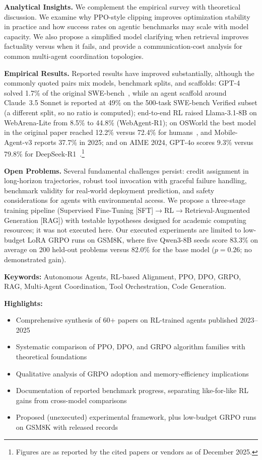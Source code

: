 \documentclass[12pt,a4paper]{report}
\theoremstyle{definition}
\begin{document}
\textbf{Analytical Insights.} We complement the empirical survey with theoretical discussion. We examine why PPO-style clipping improves optimization stability in practice and how success rates on agentic benchmarks may scale with model capacity. We also propose a simplified model clarifying when retrieval improves factuality versus when it fails, and provide a communication-cost analysis for common multi-agent coordination topologies.

\textbf{Empirical Results.} Reported results have improved substantially, although the commonly quoted pairs mix models, benchmark splits, and scaffolds: GPT-4 solved 1.7\% of the original SWE-bench~\cite{jimenez2024swebench}, while an agent scaffold around Claude~3.5 Sonnet is reported at 49\% on the 500-task SWE-bench Verified subset (a different split, so no ratio is computed); end-to-end RL raised Llama-3.1-8B on WebArena-Lite from 8.5\% to 44.8\% (WebAgent-R1); on OSWorld the best model in the original paper reached 12.2\% versus 72.4\% for humans~\cite{xie2024osworld}, and Mobile-Agent-v3 reports 37.7\% in 2025; and on AIME 2024, GPT-4o scores 9.3\% versus 79.8\% for DeepSeek-R1~\cite{deepseek2025r1}.\footnote{Figures are as reported by the cited papers or vendors as of December 2025.}

\textbf{Open Problems.} Several fundamental challenges persist: credit assignment in long-horizon trajectories, robust tool invocation with graceful failure handling, benchmark validity for real-world deployment prediction, and safety considerations for agents with environmental access. We propose a three-stage training pipeline (Supervised Fine-Tuning [SFT]$\rightarrow$RL$\rightarrow$Retrieval-Augmented Generation [RAG]) with testable hypotheses designed for academic computing resources; it was not executed here. Our executed experiments are limited to low-budget LoRA GRPO runs on GSM8K, where five Qwen3-8B seeds score 83.3\% on average on 200 held-out problems versus 82.0\% for the base model ($p=0.26$; no demonstrated gain).

\vspace{0.6cm}
\noindent \textbf{Keywords:} Autonomous Agents, RL-based Alignment, PPO, DPO, GRPO, RAG, Multi-Agent Coordination, Tool Orchestration, Code Generation.

\vspace{0.4cm}
\noindent \textbf{Highlights:}
\begin{itemize}
    \item Comprehensive synthesis of 60+ papers on RL-trained agents published 2023--2025
    \item Systematic comparison of PPO, DPO, and GRPO algorithm families with theoretical foundations
    \item Qualitative analysis of GRPO adoption and memory-efficiency implications
    \item Documentation of reported benchmark progress, separating like-for-like RL gains from cross-model comparisons
    \item Proposed (unexecuted) experimental framework, plus low-budget GRPO runs on GSM8K with released records
\end{itemize}
\end{document}
